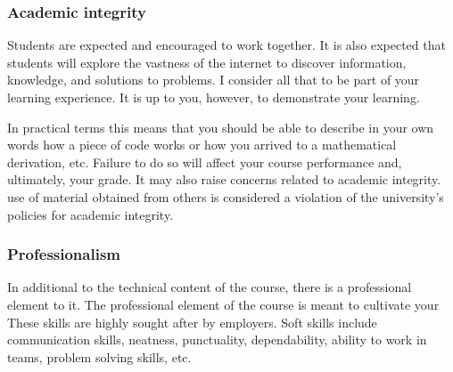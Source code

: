 \documentclass[letterpaper,10pt,english]{sphinxmanual}
\begin{document}
\subsubsection{Academic integrity}
\label{\detokenize{COMP163/organization:academic-integrity}}
Students are expected and encouraged to work together. It is also expected that students will explore the vastness of the internet to discover information, knowledge, and solutions to problems. I consider all that to be part of your learning experience. It is up to you, however, to demonstrate your learning.

In practical terms this means that you should be able to describe in your own words how a piece of code works or how you arrived to a mathematical derivation, etc. Failure to do so will affect your course performance and, ultimately, your grade. It may also raise concerns related to academic integrity.  use of material obtained from others is considered a violation of the university’s policies for academic integrity.


\subsubsection{Professionalism}
\label{\detokenize{COMP163/organization:professionalism}}
In additional to the technical content of the course, there is a professional element to it. The professional element of the course is meant to cultivate your  These skills are highly sought after by employers. Soft skills include communication skills, neatness, punctuality, dependability, ability to work in teams, problem solving skills, etc.
\end{document}
